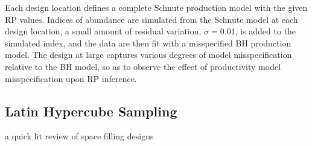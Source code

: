 \documentclass[12pt]{article}
\begin{document}
%
Each design location defines a complete Schnute production model with the given 
RP values. Indices of abundance are simulated from the Schnute model at each design
location, a small amount of residual variation, $\sigma=0.01$, is added to the 
simulated index, and the data are then fit with a misspecified BH production model. 
The design at large captures various degrees of model misspecification relative 
to the BH model, so as to observe the effect of productivity model misspecification 
upon RP inference.


%

%
%
%
%


%
\subsection{Latin Hypercube Sampling \label{lhs}}

\begin{itemize}
	{\color{red}
	\item a quick lit review of space filling designs}
\end{itemize}
\end{document}
